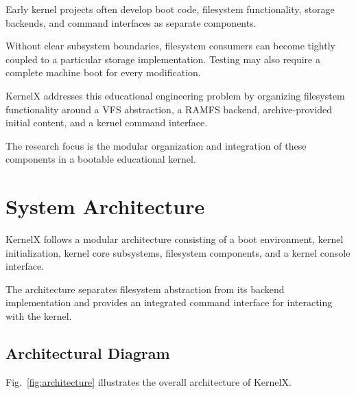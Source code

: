 \documentclass[conference]{IEEEtran}
\begin{document}
Early kernel projects often develop boot code, filesystem
functionality, storage backends, and command interfaces as
separate components.

Without clear subsystem boundaries, filesystem consumers
can become tightly coupled to a particular storage
implementation. Testing may also require a complete machine
boot for every modification.

KernelX addresses this educational engineering problem by
organizing filesystem functionality around a VFS abstraction,
a RAMFS backend, archive-provided initial content, and a
kernel command interface.

The research focus is the modular organization and integration
of these components in a bootable educational kernel.

\section{System Architecture}

KernelX follows a modular architecture consisting of a boot
environment, kernel initialization, kernel core subsystems,
filesystem components, and a kernel console interface.

The architecture separates filesystem abstraction from its
backend implementation and provides an integrated command
interface for interacting with the kernel.

\subsection{Architectural Diagram}

Fig.~\ref{fig:architecture} illustrates the overall architecture
of KernelX.
\end{document}
